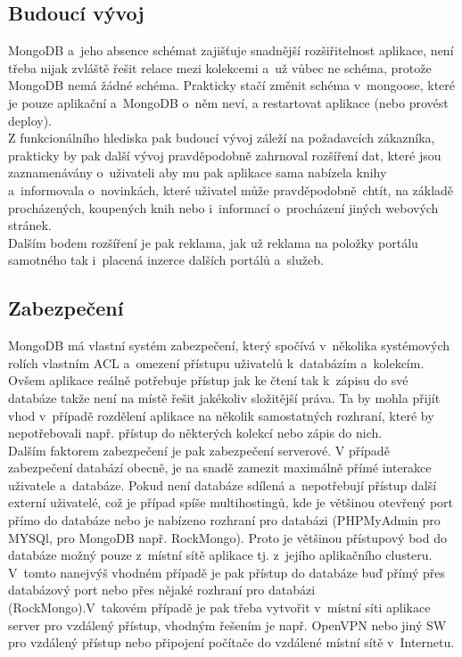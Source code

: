 \documentclass[a4paper,12pt,twoside,BCOR=10mm]{article}
\begin{document}
\subsection{Budoucí vývoj}
MongoDB a~jeho absence schémat zajišťuje snadnější rozšiřitelnost aplikace, není třeba nijak zvláště řešit relace mezi kolekcemi a~už vůbec ne schéma, protože MongoDB nemá žádné schéma. Prakticky stačí změnit schéma v~mongoose, které je pouze aplikační a~MongoDB o~něm neví, a restartovat aplikace (nebo provést deploy).\\
Z funkcionálního hlediska pak budoucí vývoj záleží na požadavcích zákazníka, prakticky by pak další vývoj pravděpodobně zahrnoval rozšíření dat, které jsou zaznamenávány o~uživateli aby mu pak aplikace sama nabízela knihy a~informovala o~novinkách, které uživatel může pravděpodobně chtít, na základě procházených, koupených knih nebo i~informací o~procházení jiných webových stránek.\\
Dalším bodem rozšíření je pak reklama, jak už reklama na položky portálu samotného tak i~placená inzerce dalších portálů a~služeb.\\

\subsection{Zabezpečení}
MongoDB má vlastní systém zabezpečení, který spočívá v~několika systémových rolích vlastním ACL a~omezení přístupu uživatelů k~databázím a~kolekcím. Ovšem aplikace reálně potřebuje přístup jak ke čtení tak k~zápisu do své databáze takže není na místě řešit jakékoliv složitější práva. Ta by mohla přijít vhod v~případě rozdělení aplikace na několik samostatných rozhraní, které by nepotřebovali např. přístup do některých kolekcí nebo zápis do nich.\\
Dalším faktorem zabezpečení je pak zabezpečení serverové. V případě zabezpečení databází obecně, je na snadě zamezit maximálně přímé interakce uživatele a~databáze. Pokud není databáze sdílená a~nepotřebují přístup další externí uživatelé, což je případ spíše multihostingů, kde je většinou otevřený port přímo do databáze nebo je nabízeno rozhraní pro databázi (PHPMyAdmin pro MYSQl, pro MongoDB např. RockMongo). Proto je většinou přístupový bod do databáze možný pouze z~místní sítě aplikace tj. z~jejího aplikačního clusteru. V~tomto nanejvýš vhodném případě je pak přístup do databáze buď přímý přes databázový port nebo přes nějaké rozhraní pro databázi (RockMongo).V~takovém případě je pak třeba vytvořit v~místní síti aplikace server pro vzdálený přístup, vhodným řešením je např. OpenVPN nebo jiný SW pro vzdálený přístup nebo připojení počítače do vzdálené místní sítě v~Internetu.
\end{document}
